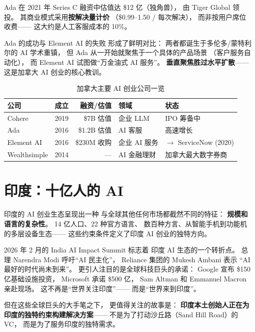 Ada 在 2021 年 Series C 融资中估值达 \$12 亿（独角兽），
由 Tiger Global 领投。
其商业模式采用\textbf{按解决量计价}
（\$0.99--1.50 / 每次解决），
而非按用户席位收费——
这大约是人工客服成本的 10\%。

Ada 的成功与 Element AI 的失败
形成了鲜明对比：
两者都诞生于多伦多/蒙特利尔的 AI 学术重镇，
但 Ada 从一开始就聚焦于一个具体的产品场景
（客户服务自动化），
而 Element AI 试图做``万金油式 AI 服务''。
\textbf{垂直聚焦胜过水平扩散}——
这是加拿大 AI 创业的核心教训。

\begin{table}[htbp]
\centering
\caption{加拿大主要 AI 创业公司一览}
\label{tab:canada-ai}
\small
\begin{tabularx}{\textwidth}{l l r l X}
\toprule
\rowcolor{figLightGray}
\textbf{公司} & \textbf{成立} & \textbf{融资/估值} & \textbf{领域} & \textbf{状态} \\
\midrule
Cohere       & 2019 & \$7B 估值   & 企业 LLM    & IPO 筹备中 \\
Ada          & 2016 & \$1.2B 估值 & AI 客服     & 高速增长 \\
Element AI   & 2016 & \$230M 收购 & 企业 AI 服务 & $\to$ ServiceNow (2020) \\
Wealthsimple & 2014 & —           & AI 金融理财 & 加拿大最大数字券商 \\
\bottomrule
\end{tabularx}
\end{table}

\section{印度：十亿人的 AI}
\label{sec:global-india}

印度的 AI 创业生态呈现出一种
与全球其他任何市场都截然不同的特征：
\textbf{规模和语言的复杂性}。
14 亿人口、22 种官方语言、
数百种方言、从智能手机到功能机的多层设备生态——
这些约束条件定义了印度 AI 创业的独特方向。

2026 年 2 月的 India AI Impact Summit 标志着
印度 AI 生态的一个转折点。
总理 Narendra Modi 呼吁``AI 民主化''，
Reliance 集团的 Mukesh Ambani 表示
``AI 最好的时代尚未到来''。
更引人注目的是全球科技巨头的承诺：
Google 宣布 \$150 亿基础设施投资，
Microsoft 承诺 \$500 亿，
Sam Altman 和 Emmanuel Macron 亲赴现场。
这不再是``世界关注印度''——
而是``世界来到印度''。

但在这些全球巨头的大手笔之下，
更值得关注的故事是：
\textbf{印度本土创始人正在为印度的独特约束构建解决方案}——
不是为了打动沙丘路（Sand Hill Road）的 VC，
而是为了服务印度的独特需求。

